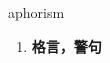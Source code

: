 
\begin{frame}
{\huge aphorism}
\begin{center}
\begin{enumerate}\Large
  \item \textbf{格言，警句}
\end{enumerate}
\end{center}
\end{frame}
